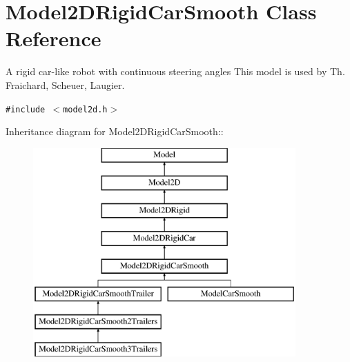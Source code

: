 \section{Model2DRigid\-Car\-Smooth  Class Reference}
\label{classModel2DRigidCarSmooth}
A rigid car-like robot with continuous steering angles This model is used by Th. Fraichard, Scheuer, Laugier. 


{\tt \#include $<$model2d.h$>$}

Inheritance diagram for Model2DRigid\-Car\-Smooth::\begin{figure}[H]
\begin{center}
\leavevmode
\includegraphics[height=8cm]{classModel2DRigidCarSmooth}
\end{center}
\end{figure}
